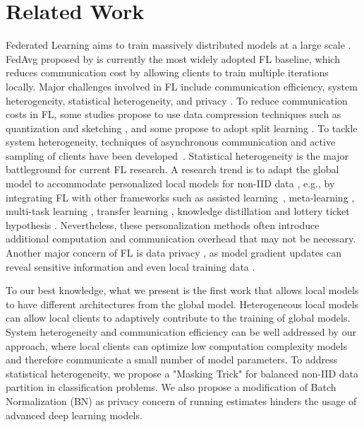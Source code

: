 \documentclass{article} %
\begin{document}
\section{Related Work}
Federated Learning aims to train massively distributed models at a large scale \citep{bonawitz2019towards}. FedAvg proposed by \citet{mcmahan2017communication} is currently the most widely adopted FL baseline, which reduces communication cost by allowing clients to train multiple iterations locally. Major challenges involved in FL include communication efficiency, system heterogeneity, statistical heterogeneity, and privacy \citep{li2020federated}. To reduce communication costs in FL, some studies propose to use data compression techniques such as quantization and sketching \citep{konevcny2016federated,alistarh2017qsgd,ivkin2019communication}, and some propose to adopt split learning \citep{thapa2020splitfed}. To tackle system heterogeneity,  techniques of asynchronous communication and active sampling of clients have been developed~\citep{bonawitz2019towards, nishio2019client}. Statistical heterogeneity is the major battleground for current FL research. A research trend is to adapt the global model to accommodate personalized local models for non-IID data \citep{liang2020think}, e.g., by integrating FL with other frameworks such as assisted learning~\citep{DingAssist}, meta-learning \citep{jiang2019improving, khodak2019adaptive}, multi-task learning \citep{smith2017federated}, transfer learning \citep{wang2019federated, mansour2020three}, knowledge distillation \citep{li2019fedmd} and lottery ticket hypothesis \citep{li2020lotteryfl}. Nevertheless, these personalization methods often introduce additional computation and communication overhead that may not be necessary. %
Another major concern of FL is data privacy \citep {lyu2020threats}, as model gradient updates can reveal sensitive information \citep{melis2019exploiting} and even local training data \citep{zhu2019deep, zhao2020idlg}. 

To our best knowledge, what we present is the first work that allows local models to have different architectures from the global model. Heterogeneous local models can allow local clients to adaptively contribute to the training of global models. System heterogeneity and communication efficiency can be well addressed by our approach, where local clients can optimize low computation complexity models and therefore communicate a small number of model parameters. To address statistical heterogeneity, we propose a "Masking Trick" for balanced non-IID data partition in classification problems. We also propose a modification of Batch Normalization (BN) \citep{ioffe2015batch} as privacy concern of running estimates hinders the usage of advanced deep learning models.
\end{document}
